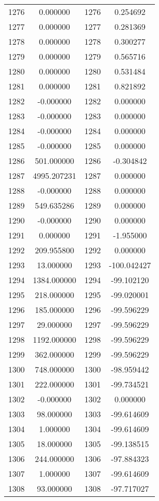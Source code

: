 \documentclass[12pt]{article}
\begin{document}
\begin{longtable}{@{}cccc@{}}
1276 & 0.000000 & 1276 & 0.254692 \\
1277 & 0.000000 & 1277 & 0.281369 \\
1278 & 0.000000 & 1278 & 0.300277 \\
1279 & 0.000000 & 1279 & 0.565716 \\
1280 & 0.000000 & 1280 & 0.531484 \\
1281 & 0.000000 & 1281 & 0.821892 \\
1282 & -0.000000 & 1282 & 0.000000 \\
1283 & -0.000000 & 1283 & 0.000000 \\
1284 & -0.000000 & 1284 & 0.000000 \\
1285 & -0.000000 & 1285 & 0.000000 \\
1286 & 501.000000 & 1286 & -0.304842 \\
1287 & 4995.207231 & 1287 & 0.000000 \\
1288 & -0.000000 & 1288 & 0.000000 \\
1289 & 549.635286 & 1289 & 0.000000 \\
1290 & -0.000000 & 1290 & 0.000000 \\
1291 & 0.000000 & 1291 & -1.955000 \\
1292 & 209.955800 & 1292 & 0.000000 \\
1293 & 13.000000 & 1293 & -100.042427 \\
1294 & 1384.000000 & 1294 & -99.102120 \\
1295 & 218.000000 & 1295 & -99.020001 \\
1296 & 185.000000 & 1296 & -99.596229 \\
1297 & 29.000000 & 1297 & -99.596229 \\
1298 & 1192.000000 & 1298 & -99.596229 \\
1299 & 362.000000 & 1299 & -99.596229 \\
1300 & 748.000000 & 1300 & -98.959442 \\
1301 & 222.000000 & 1301 & -99.734521 \\
1302 & -0.000000 & 1302 & 0.000000 \\
1303 & 98.000000 & 1303 & -99.614609 \\
1304 & 1.000000 & 1304 & -99.614609 \\
1305 & 18.000000 & 1305 & -99.138515 \\
1306 & 244.000000 & 1306 & -97.884323 \\
1307 & 1.000000 & 1307 & -99.614609 \\
1308 & 93.000000 & 1308 & -97.717027 \\

\end{longtable}
\end{document}
